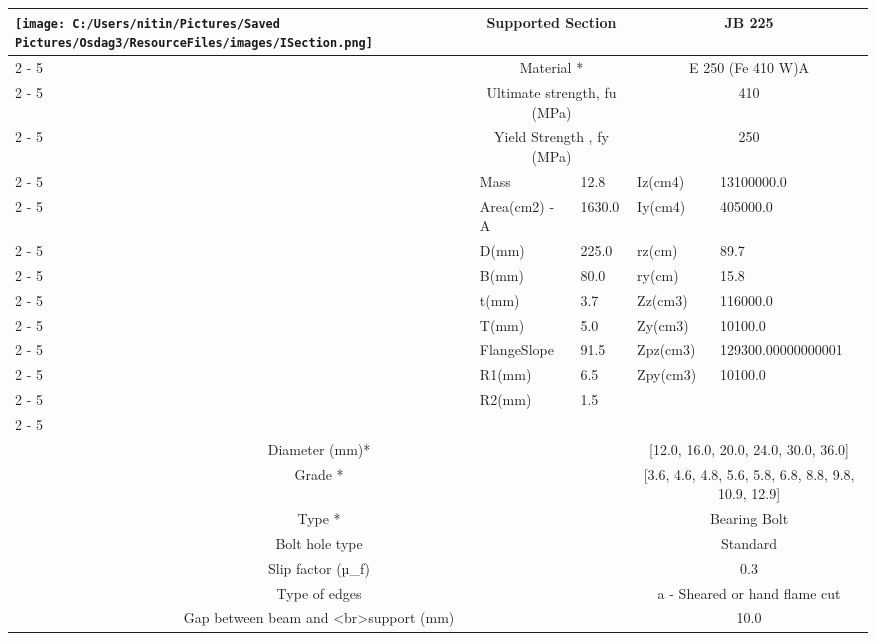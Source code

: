 \documentclass{article}%
\begin{document}
\begin{longtable}{|p{5cm}|p{2cm}|p{2cm}|p{2cm}|p{5cm}|}
\hline%
\hline%
\multirow{13}{*}{\texttt{[image: C:/Users/nitin/Pictures/Saved Pictures/Osdag3/ResourceFiles/images/ISection.png]}}&\multicolumn{2}{|c|}{Supported Section}&\multicolumn{2}{|c|}{JB 225}\\%
\cline{2%
-%
5}%
&\multicolumn{2}{|c|}{Material *}&\multicolumn{2}{|c|}{E 250 (Fe 410 W)A}\\%
\cline{2%
-%
5}%
&\multicolumn{2}{|c|}{Ultimate strength, fu (MPa)}&\multicolumn{2}{|c|}{410}\\%
\cline{2%
-%
5}%
&\multicolumn{2}{|c|}{Yield Strength , fy (MPa)}&\multicolumn{2}{|c|}{250}\\%
\cline{2%
-%
5}%
&Mass&12.8&Iz(cm4)&13100000.0\\%
\cline{2%
-%
5}%
&Area(cm2) {-} A&1630.0&Iy(cm4)&405000.0\\%
\cline{2%
-%
5}%
&D(mm)&225.0&rz(cm)&89.7\\%
\cline{2%
-%
5}%
&B(mm)&80.0&ry(cm)&15.8\\%
\cline{2%
-%
5}%
&t(mm)&3.7&Zz(cm3)&116000.0\\%
\cline{2%
-%
5}%
&T(mm)&5.0&Zy(cm3)&10100.0\\%
\cline{2%
-%
5}%
&FlangeSlope&91.5&Zpz(cm3)&129300.00000000001\\%
\cline{2%
-%
5}%
&R1(mm)&6.5&Zpy(cm3)&10100.0\\%
\cline{2%
-%
5}%
&R2(mm)&1.5&&\\%
\cline{2%
-%
5}%
\hline%
\multicolumn{5}{|c|}{\textbf{Bolt Details}}\\%
\hline%
\hline%
\multicolumn{3}{|c|}{Diameter (mm)*}&\multicolumn{2}{|c|}{{[}12.0, 16.0, 20.0, 24.0, 30.0, 36.0{]}}\\%
\hline%
\hline%
\multicolumn{3}{|c|}{Grade *}&\multicolumn{2}{|c|}{{[}3.6, 4.6, 4.8, 5.6, 5.8, 6.8, 8.8, 9.8, 10.9, 12.9{]}}\\%
\hline%
\hline%
\multicolumn{3}{|c|}{Type *}&\multicolumn{2}{|c|}{Bearing Bolt}\\%
\hline%
\hline%
\multicolumn{3}{|c|}{Bolt hole type}&\multicolumn{2}{|c|}{Standard}\\%
\hline%
\hline%
\multicolumn{3}{|c|}{Slip factor (µ\_f)}&\multicolumn{2}{|c|}{0.3}\\%
\hline%
\hline%
\multicolumn{3}{|c|}{Type of edges}&\multicolumn{2}{|c|}{a {-} Sheared or hand flame cut}\\%
\hline%
\hline%
\multicolumn{3}{|c|}{Gap between beam and <br>support (mm)}&\multicolumn{2}{|c|}{10.0}\\%
\hline%
\hline%

\end{longtable}
\end{document}
